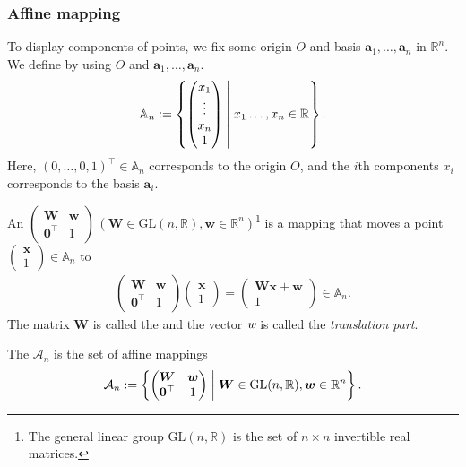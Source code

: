 \subsubsection{Affine mapping}

To display components of points, we fix some origin $O$ and basis $\bm{a}_{1}, \dots, \bm{a}_{n}$ in $\mathbb{R}^{n}$.
We define  by using $O$ and $\bm{a}_{1}, \dots, \bm{a}_{n}$.
\begin{align}
  \mathbb{A}_{n} := \left\{  \begin{pmatrix} x_{1} \\ \vdots \\ x_{n} \\ 1 \end{pmatrix}  \mathrel{}\middle|\mathrel{}  x_{1} \dots, x_{n} \in \mathbb{R}  \right\}.
\end{align}
Here, $(0, \dots, 0, 1)^{\top} \in \mathbb{A}_{n}$ corresponds to the origin $O$, and the $i$th components $x_{i}$ corresponds to the basis $\bm{a}_{i}$.

\begin{screen}
  \begin{defn}
    An  $\begin{pmatrix} \bm{W} & \bm{w} \\ \bm{0}^{\top} & 1 \end{pmatrix} \,( \bm{W} \in \mathrm{GL}(n, \mathbb{R}), \bm{w} \in \mathbb{R}^{n} ) $\footnote{The general linear group $\mathrm{GL}(n, \mathbb{R})$ is the set of $n \times n$ invertible real matrices.} is a mapping that moves a point $ \begin{pmatrix} \bm{x} \\ 1 \end{pmatrix} \in \mathbb{A}_{n}$ to
      \begin{align}
        \begin{pmatrix} \bm{W} & \bm{w} \\ \bm{0}^{\top} & 1 \end{pmatrix} \begin{pmatrix} \bm{x} \\ 1 \end{pmatrix}
          = \begin{pmatrix} \bm{Wx} + \bm{w} \\ 1 \end{pmatrix} \in \mathbb{A}_{n}.
      \end{align}
    The matrix $\bm{W}$ is called the  and the vector $\textit{w}$ is called the \textit{translation part}.

    The  $\mathcal{A}_{n}$ is the set of affine mappings
    \begin{align}
      \mathcal{A}_{n} := \left\{  \begin{pmatrix} \bm{W} & \bm{w} \\ \bm{0}^{\top} & 1 \end{pmatrix}  \mathrel{}\middle|\mathrel{}  \bm{W} \in \mathrm{GL}(n, \mathbb{R}), \bm{w} \in \mathbb{R}^{n}  \right\}.
    \end{align}
  \end{defn}
\end{screen}

